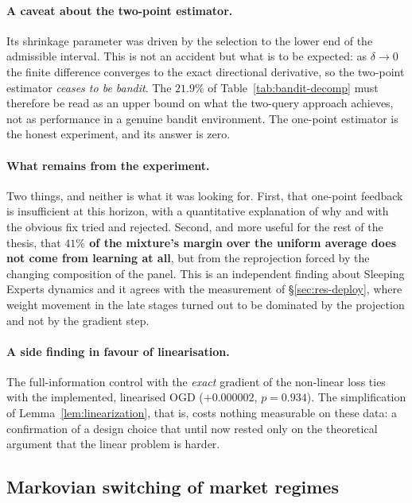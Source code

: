 \documentclass[12pt,a4paper,oneside]{report}
\renewcommand{\_}{\oldunderscore\allowbreak}
\theoremstyle{definition}
\theoremstyle{plain}
\theoremstyle{remark}
\begin{document}
\paragraph{A caveat about the two-point estimator.} Its shrinkage parameter was driven by the
selection to the lower end of the admissible interval. This is not an accident but what is to be
expected: as $\delta\to 0$ the finite difference converges to the exact directional derivative, so
the two-point estimator \emph{ceases to be bandit}. The $21.9\%$ of Table~\ref{tab:bandit-decomp}
must therefore be read as an upper bound on what the two-query approach achieves, not as
performance in a genuine bandit environment. The one-point estimator is the honest experiment, and
its answer is zero.

\paragraph{What remains from the experiment.} Two things, and neither is what it was looking for.
First, that one-point feedback is insufficient at this horizon, with a quantitative explanation of
why and with the obvious fix tried and rejected. Second, and more useful for the rest of the
thesis, that \textbf{$41\%$ of the mixture's margin over the uniform average does not come from
learning at all}, but from the reprojection forced by the changing composition of the panel. This
is an independent finding about Sleeping Experts dynamics and it agrees with the measurement of
\S\ref{sec:res-deploy}, where weight movement in the late stages turned out to be dominated by the
projection and not by the gradient step.

\paragraph{A side finding in favour of linearisation.} The full-information control with the
\emph{exact} gradient of the non-linear loss ties with the implemented, linearised OGD
($+0.000002$, $p=0.934$). The simplification of Lemma~\ref{lem:linearization}, that is, costs
nothing measurable on these data: a confirmation of a design choice that until now rested only
on the theoretical argument that the linear problem is harder.

\subsection{Markovian switching of market regimes}
\label{sec:res-regime}
\end{document}
